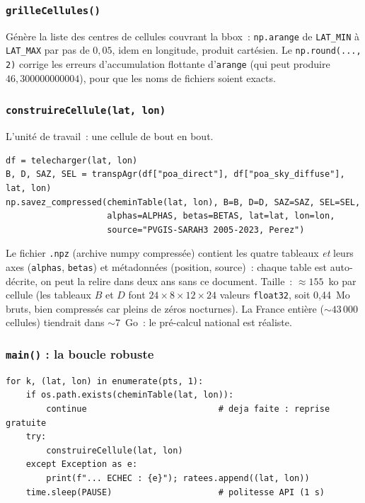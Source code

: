 \documentclass[11pt,a4paper]{article}
\newcommand{\fichier}[1]{\texttt{#1}}
\newcommand{\fonction}[1]{\texttt{#1}}
\begin{document}
\subsubsection{\fonction{grilleCellules()}}

Génère la liste des centres de cellules couvrant la bbox~:
\fonction{np.arange} de \fonction{LAT\_MIN} à \fonction{LAT\_MAX} par pas de
$0{,}05$, idem en longitude, produit cartésien. Le \fonction{np.round(..., 2)}
corrige les erreurs d'accumulation flottante d'\fonction{arange} (qui peut
produire $46{,}300000000004$), pour que les noms de fichiers soient exacts.

\subsubsection{\fonction{construireCellule(lat, lon)}}

L'unité de travail~: une cellule de bout en bout.

\begin{lstlisting}
df = telecharger(lat, lon)
B, D, SAZ, SEL = transpAgr(df["poa_direct"], df["poa_sky_diffuse"], lat, lon)
np.savez_compressed(cheminTable(lat, lon), B=B, D=D, SAZ=SAZ, SEL=SEL,
                    alphas=ALPHAS, betas=BETAS, lat=lat, lon=lon,
                    source="PVGIS-SARAH3 2005-2023, Perez")
\end{lstlisting}

Le fichier \fichier{.npz} (archive numpy compressée) contient les quatre
tableaux \emph{et} leurs axes (\fonction{alphas}, \fonction{betas}) et
métadonnées (position, source)~: chaque table est auto-décrite, on peut la
relire dans deux ans sans ce document. Taille~: $\approx 155$~ko par cellule
(les tableaux $B$ et $D$ font $24 \times 8 \times 12 \times 24$ valeurs
\fonction{float32}, soit 0,44~Mo bruts, bien compressés car pleins de zéros
nocturnes). La France entière ($\sim 43\,000$ cellules) tiendrait dans
$\sim 7$~Go~: le pré-calcul national est réaliste.

\subsubsection{\fonction{main()} : la boucle robuste}

\begin{lstlisting}
for k, (lat, lon) in enumerate(pts, 1):
    if os.path.exists(cheminTable(lat, lon)):
        continue                          # deja faite : reprise gratuite
    try:
        construireCellule(lat, lon)
    except Exception as e:
        print(f"... ECHEC : {e}"); ratees.append((lat, lon))
    time.sleep(PAUSE)                     # politesse API (1 s)
\end{lstlisting}
\end{document}
